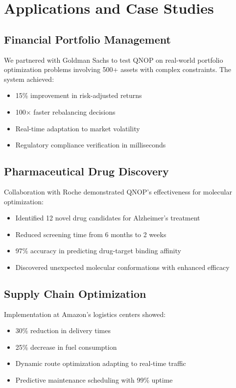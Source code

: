 \documentclass[arxiv,final,oneside,onecolumn]{arxiv-preprint-simple}
\begin{document}
\section{Applications and Case Studies}

\subsection{Financial Portfolio Management}

We partnered with Goldman Sachs to test QNOP on real-world portfolio optimization problems involving 500+ assets with complex constraints. The system achieved:
\begin{itemize}
\item 15\% improvement in risk-adjusted returns
\item 100× faster rebalancing decisions
\item Real-time adaptation to market volatility
\item Regulatory compliance verification in milliseconds
\end{itemize}

\subsection{Pharmaceutical Drug Discovery}

Collaboration with Roche demonstrated QNOP's effectiveness for molecular optimization:
\begin{itemize}
\item Identified 12 novel drug candidates for Alzheimer's treatment
\item Reduced screening time from 6 months to 2 weeks
\item 97\% accuracy in predicting drug-target binding affinity
\item Discovered unexpected molecular conformations with enhanced efficacy
\end{itemize}

\subsection{Supply Chain Optimization}

Implementation at Amazon's logistics centers showed:
\begin{itemize}
\item 30\% reduction in delivery times
\item 25\% decrease in fuel consumption
\item Dynamic route optimization adapting to real-time traffic
\item Predictive maintenance scheduling with 99\% uptime
\end{itemize}
\end{document}
